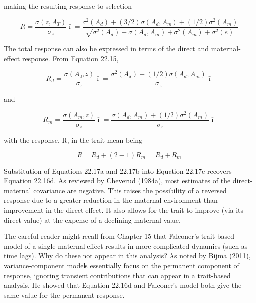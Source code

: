 \documentclass{article}
\begin{document}
making the resulting response to selection

\begin{equation}
R=\frac{\sigma(z,A_{T})}{\sigma_{z}}\bar{\imath}=\frac{\sigma^{2}(A_{d})+(3/2)\sigma(A_{d},A_{m})+(1/2)\sigma^{2}\left(A_{m}\right)}{\sqrt{\sigma^{2}(A_{d})+\sigma(A_{d},A_{m})+\sigma^{2}(A_{m})+\sigma^{2}(e)}}
\tag{22.16d}
\label{eq:22_16d}
\end{equation}

The total response can also be expressed in terms of the direct and maternal-effect response. From Equation 22.15,

\begin{equation}
R_{d}=\frac{\sigma(A_{d},z)}{\sigma_{z}}\bar{\imath}=\frac{\sigma^{2}(A_{d})+(1/2)\sigma(A_{d},A_{m})}{\sigma_{z}}\bar{\imath}
\tag{22.17a}
\label{eq:22_17a}
\end{equation}

and

\begin{equation}
R_{m}=\frac{\sigma(A_{m},z)}{\sigma_{z}}\overline{\imath}=\frac{\sigma(A_{d},A_{m})+(1/2)\sigma^{2}(A_{m})}{\sigma_{z}}\overline{\imath}
\tag{22.17b}
\label{eq:22_17b}
\end{equation}

with the response, R, in the trait mean being

\begin{equation}
R=R_{d}+(2-1)R_{m}=R_{d}+R_{m}
\tag{22.17c}
\label{eq:22_17c}
\end{equation}

Substitution of Equations 22.17a and 22.17b into Equation 22.17c recovers Equation 22.16d. As reviewed by Cheverud (1984a), most estimates of the direct-maternal covariance are negative. This raises the possibility of a reversed response due to a greater reduction in the maternal environment than improvement in the direct effect. It also allows for the trait to improve (via its direct value) at the expense of a declining maternal value.

The careful reader might recall from Chapter 15 that Falconer’s trait-based model of a single maternal effect results in more complicated dynamics (such as time lags). Why do these not appear in this analysis? As noted by Bijma (2011), variance-component models essentially focus on the permanent component of response, ignoring transient contributions that can appear in a trait-based analysis. He showed that Equation 22.16d and Falconer’s model both give the same value for the permanent response.
\end{document}
